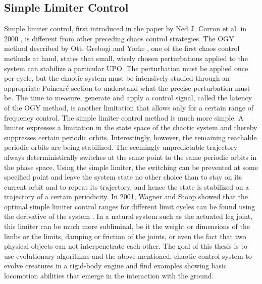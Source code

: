 \documentclass[main]{subfiles}
\begin{document}
\subsection{Simple Limiter Control}

Simple limiter control, first introduced in the paper by Ned J. Corron et al. in 2000 \cite{bib:Corron2000}, is different from other preceding chaos control strategies. %
%
The OGY method described by Ott, Grebogi and Yorke \cite{bib:Ott1990}, one of the first chaos control methods at hand, states that small, wisely chosen perturbations applied to the system can stabilize a particular UPO. %
%
The perturbation must be applied once per cycle, but the chaotic system must be intensively studied through an appropriate Poincaré section to understand what the precise perturbation must be. %
%
The time to measure, generate and apply a control signal, called the latency of the OGY method, is another limitation that allows only for a certain range of frequency control. %
%
The simple limiter control method is much more simple. A limiter expresses a limitation in the state space of the chaotic system and thereby suppresses certain periodic orbits. %
%
%
Interestingly, however, the remaining reachable periodic orbits are being stabilized. %
%
The seemingly unpredictable trajectory always deterministically switches at the same point to the same periodic orbits in the phase space. %
%
Using the simple limiter, the switching can be prevented at some specified point and leave the system state no other choice than to stay on its current orbit and to repeat its trajectory, and hence the state is stabilized on a trajectory of a certain periodicity. %
%
In 2001, Wagner and Stoop showed that the optimal simple limiter control ranges for different limit cycles can be found using the derivative of the system \cite{bib:Wagner2001}. %
%
In a natural system such as the actuated leg joint, this limiter can be much more subliminal, be it the weight or dimensions of the limbs or the limits, damping or friction of the joints, or even the fact that two physical objects can not interpenetrate each other. %
%
The goal of this thesis is to use evolutionary algorithms and the above mentioned, chaotic control system to evolve creatures in a rigid-body engine and find examples showing basic locomotion abilities that emerge in the interaction with the ground.
\end{document}
